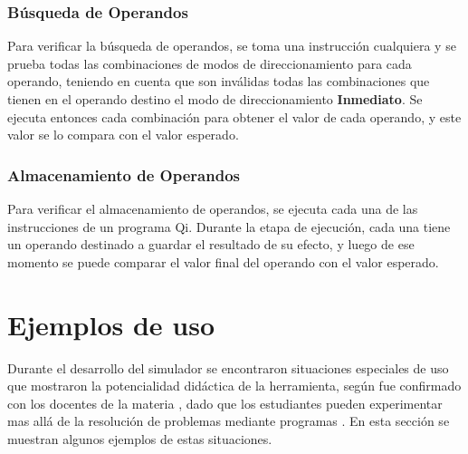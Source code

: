 \subsubsection{Búsqueda de Operandos}

Para verificar la búsqueda de operandos, se toma una instrucción cualquiera y se prueba todas las combinaciones de modos de direccionamiento para cada operando, teniendo en cuenta que son inválidas todas las combinaciones que tienen en el operando destino el modo de direccionamiento \textbf{Inmediato}. Se ejecuta entonces cada combinación para obtener el valor de cada operando, y este valor se lo compara con el valor esperado. 
 
\subsubsection{Almacenamiento de Operandos}

Para verificar el almacenamiento de operandos, se ejecuta cada una de las instrucciones de un programa Qi. Durante la etapa de ejecución, cada una tiene un operando destinado a guardar el resultado de su efecto, y luego de ese momento se puede comparar el valor final del operando con el valor esperado.

\section{Ejemplos de uso}

Durante el desarrollo del simulador se encontraron situaciones especiales de uso que mostraron la potencialidad didáctica de la herramienta, según fue confirmado con los docentes de la materia \orga, dado que los estudiantes pueden experimentar mas allá de la resolución de problemas mediante programas \qi. En esta sección se muestran algunos ejemplos de estas situaciones.

